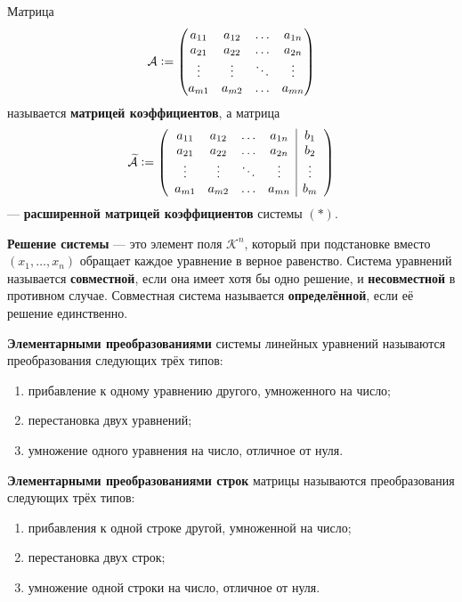 \begin{definition}
    Матрица
    $$
    \mathcal{A} \vcentcolon = 
    \begin{pmatrix}
        a_{11} & a_{12} & \ldots & a_{1n}\\
        a_{21} & a_{22} & \ldots & a_{2n}\\
        \vdots & \vdots & \ddots & \vdots\\
        a_{m1} & a_{m2} & \ldots & a_{mn}\\
    \end{pmatrix}
    $$
    называется \textbf{матрицей коэффициентов}, а матрица 
    $$
    \widetilde{\mathcal{A}} \vcentcolon =
    \left(
    \begin{array}{cccc | c}
        a_{11} & a_{12} & \ldots & a_{1n} & b_1\\
        a_{21} & a_{22} & \ldots & a_{2n} & b_2\\
        \vdots & \vdots & \ddots & \vdots & \vdots\\
        a_{m1} & a_{m2} & \ldots & a_{mn} & b_m\\
    \end{array}
    \right)
    $$
    --- \textbf{расширенной матрицей коэффициентов} системы $(\ast)$.
\end{definition}

\begin{definition}
    \textbf{Решение системы} --- это элемент поля $\mathcal{K}^n$, который при подстановке вместо $(x_1, \ldots, x_n)$ обращает каждое уравнение в верное равенство. Система уравнений называется \textbf{совместной}, если она имеет хотя бы одно решение, и \textbf{несовместной} в противном случае. Совместная система называется \textbf{определённой}, если её решение единственно.
\end{definition}

\begin{definition}
    \textbf{Элементарными преобразованиями} системы линейных уравнений называются преобразования следующих трёх типов:
    \begin{enumerate}[nolistsep]
        \item прибавление к одному уравнению другого, умноженного на число;
        \item перестановка двух уравнений;
        \item умножение одного уравнения на число, отличное от нуля.
    \end{enumerate}

    \textbf{Элементарными преобразованиями строк} матрицы называются преобразования следующих трёх типов:
    \begin{enumerate}[nolistsep]
        \item прибавления к одной строке другой, умноженной на число;
        \item перестановка двух строк;
        \item умножение одной строки на число, отличное от нуля.
    \end{enumerate}
\end{definition}

